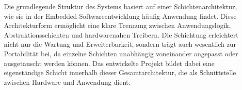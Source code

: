 %
%
%
%
%

Die grundlegende Struktur des Systems basiert auf einer Schichtenarchitektur, wie sie in der Embedded-Softwareentwicklung häufig Anwendung findet. 
Diese Architekturform ermöglicht eine klare Trennung zwischen Anwendungslogik, Abstraktionsschichten und hardwarenahen Treibern. 
Die Schichtung erleichtert nicht nur die Wartung und Erweiterbarkeit, sondern trägt auch wesentlich zur Portabilität bei, da einzelne Schichten unabhängig voneinander angepasst oder ausgetauscht werden können. 
Das entwickelte Projekt bildet dabei eine eigenständige Schicht innerhalb dieser Gesamtarchitektur, die als Schnittstelle zwischen Hardware und Anwendung dient.


